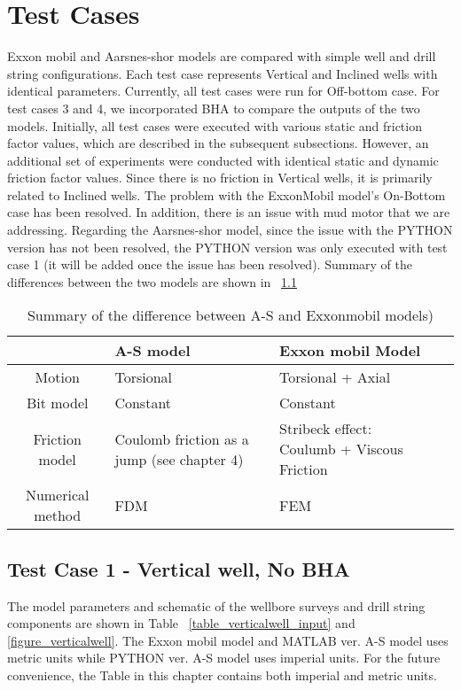 \chapter{Test Cases}
Exxon mobil and Aarsnes-shor models are compared with simple well and drill string configurations. Each test case represents Vertical and Inclined wells with identical parameters. Currently, all test cases were run for Off-bottom case. For test cases 3 and 4, we incorporated BHA to compare the outputs of the two models. Initially, all test cases were executed with various static and friction factor values, which are described in the subsequent subsections. However, an additional set of experiments were conducted with identical static and dynamic friction factor values. Since there is no friction in Vertical wells, it is primarily related to Inclined wells. The problem with the ExxonMobil model's On-Bottom case has been resolved. In addition, there is an issue with mud motor that we are addressing. Regarding the Aarsnes-shor model, since the issue with the PYTHON version has not been resolved, the PYTHON version was only executed with test case 1 (it will be added once the issue has been resolved). Summary of the differences between the two models are shown in \tablename~\ref{table_model_difference}

\begin{table}[!hbt]
\centering
\begin{tabular}{|c|p{1.8in}|p{1.8in}|c|}
\hline 
 & A-S model & Exxon mobil Model\\
\hline
Motion & Torsional & Torsional + Axial\\                                                              
\hline
Bit model & Constant & Constant \\                                                  
\hline
Friction model & Coulomb friction as a jump (see chapter 4) & Stribeck  effect: Coulumb + Viscous Friction \\                                                  
\hline
Numerical method & FDM & FEM\\      
\hline                                                 
\end{tabular}
\caption[Summary of the difference between two models]{Summary of the difference between A-S and Exxonmobil models)}\label{table_model_difference}
\end{table}



\section{Test Case 1 - Vertical well, No BHA}
The model parameters and schematic of the wellbore surveys and drill string components are shown in Table \tablename~\ref{table_verticalwell_input} and \ref{figure_verticalwell}. The Exxon mobil model and MATLAB ver. A-S model uses metric units while PYTHON ver. A-S model uses imperial units. For the future convenience, the Table in this chapter contains both imperial and metric units.


